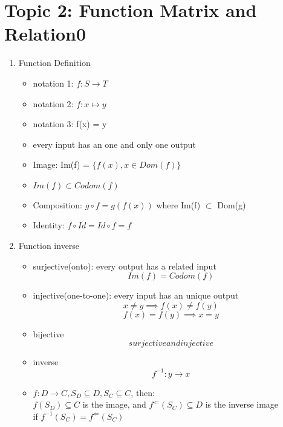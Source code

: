 \documentclass[11pt, a4paper]{article}
\begin{document}
\section*{Topic 2: Function Matrix and Relation0}
    \begin{enumerate}
        \item Function Definition
            \begin{itemize}
                \item notation 1: $f: S \rightarrow T$
                \item notation 2: $f: x \mapsto y$
                \item notation 3: f(x) = y
                \item every input has an one and only one output
                \item Image: Im(f) = $\{f(x), x \in Dom(f)\}$
                \item $Im(f) \subset Codom(f)$
                \item Composition: $g \circ f = g(f(x))$ where Im(f) $\subset$ Dom(g)
                \item Identity: $f \circ Id = Id \circ f = f$
            \end{itemize}
        \item Function inverse
            \begin{itemize}
                \item surjective(onto): every output has a related input\\
                    $$Im(f) = Codom(f)$$
                \item injective(one-to-one): every input has an unique output\\
                    $$x \ne y \implies f(x) \ne f(y)$$
                    $$f(x) = f(y) \implies x = y$$
                \item bijective\\
                    $$surjective and injective$$
                \item inverse\\
                    $$f^{-1}: y \rightarrow x$$
                \item $f: D \rightarrow C, S_D \subseteq D, S_C \subseteq C$, then:\\
                    $f(S_D) \subseteq C$ is the image, and $f^{\Leftarrow}(S_C) \subseteq D$ is the inverse image\\
                    if $f^{-1}(S_C) = f^{\Leftarrow}(S_C)$
            \end{itemize}

\end{enumerate}
\end{document}
